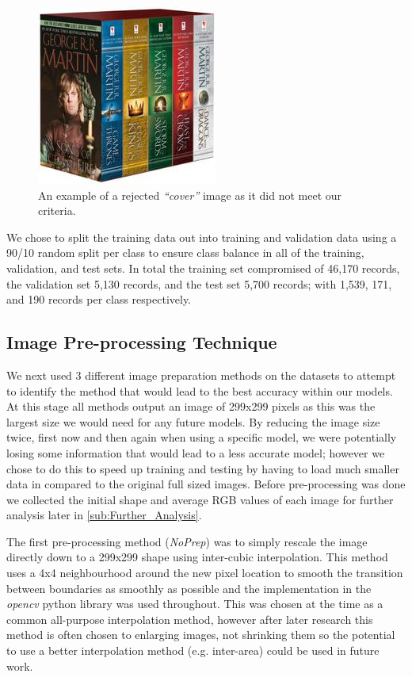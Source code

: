 \documentclass[12pt]{article}
\numberwithin{equation}{section}
\numberwithin{figure}{section}
\begin{document}
\begin{figure}
	\centering
	\captionsetup{justification=centering}
	\includegraphics[scale=0.5]{0345535529.jpg}
	\caption{An example of a rejected \emph{``cover''} image as it did not meet our criteria.}
	\label{fig:bad_cover}
\end{figure}

We chose to split the training data out into training and validation data using a 90/10 random split per class to ensure class balance in all of the training, validation, and test sets. In total the training set compromised of 46,170 records, the validation set 5,130 records, and the test set 5,700 records; with 1,539, 171, and 190 records per class respectively. 

\subsection{Image Pre-processing Technique} 
\label{sub:Image_Pre-processing_Technique} 

We next used 3 different image preparation methods on the datasets to attempt to identify the method that would lead to the best accuracy within our models. At this stage all methods output an image of 299x299 pixels as this was the largest size we would need for any future models. By reducing the image size twice, first now and then again when using a specific model, we were potentially losing some information that would lead to a less accurate model; however we chose to do this to speed up training and testing by having to load much smaller data in compared to the original full sized images. Before pre-processing was done we collected the initial shape and average RGB values of each image for further analysis later in \cref{sub:Further_Analysis}.

The first pre-processing method (\emph{NoPrep}) was to simply rescale the image directly down to a 299x299 shape using inter-cubic interpolation. This method uses a 4x4 neighbourhood around the new pixel location to smooth the transition between boundaries as smoothly as possible and the implementation in the \emph{opencv} python library was used throughout. This was chosen at the time as a common all-purpose interpolation method, however after later research this method is often chosen to enlarging images, not shrinking them so the potential to use a better interpolation method (e.g. inter-area) could be used in future work.
\end{document}
